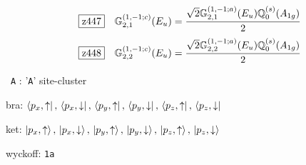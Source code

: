 \documentclass[fleqn,10pt,landscape]{jsarticle}
\begin{document}
\begin{dmath*}
\hspace*{3mm}\fbox{z447}\quad \mathbb{G}_{2,1}^{(1,-1;c)}(E_{u})=\frac{\sqrt{2} \mathbb{G}_{2,1}^{(1,-1;a)}(E_{u}) \mathbb{Q}_{0}^{(s)}(A_{1g})}{2}
\end{dmath*}
\begin{dmath*}
\hspace*{3mm}\fbox{z448}\quad \mathbb{G}_{2,2}^{(1,-1;c)}(E_{u})=\frac{\sqrt{2} \mathbb{G}_{2,2}^{(1,-1;a)}(E_{u}) \mathbb{Q}_{0}^{(s)}(A_{1g})}{2}
\end{dmath*}
\vspace{5mm}

\noindent\textbullet\, \texttt{A} : '\texttt{A}' site-cluster

\noindent\quad * bra: $\bra{p_{x},\uparrow},\, \bra{p_{x},\downarrow},\, \bra{p_{y},\uparrow},\, \bra{p_{y},\downarrow},\, \bra{p_{z},\uparrow},\, \bra{p_{z},\downarrow}$

\noindent\quad * ket: $\ket{p_{x},\uparrow},\, \ket{p_{x},\downarrow},\, \ket{p_{y},\uparrow},\, \ket{p_{y},\downarrow},\, \ket{p_{z},\uparrow},\, \ket{p_{z},\downarrow}$

\noindent\quad * wyckoff: \texttt{1a}
\end{document}
